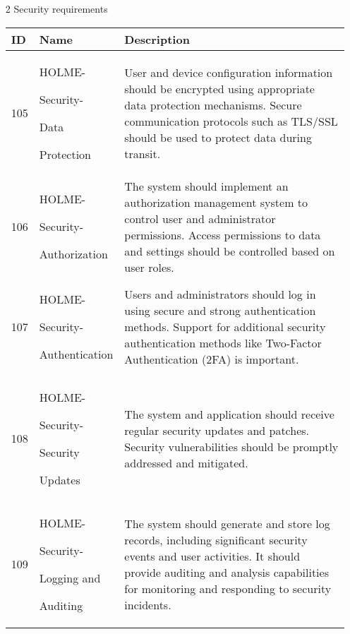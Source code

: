 \documentclass[conference]{IEEEtran}
\begin{document}
\begin{enumerate}
\vspace{3cm}
\item[2] Security requirements
\begin{table}[h]
\def\arraystretch{1.2} \small
    \begin{tabular}{|p{1cm}|p{1.8cm}|p{5.0cm}|}
        \hline
        ID & Name & Description\\ \hline
        105 \par  & HOLME-\par Security-\par Data \par Protection & User and device configuration information should be encrypted using appropriate data protection mechanisms. Secure communication protocols such as TLS/SSL should be used to protect data during transit.\\ \hline
         106 \par  & HOLME-\par Security-\par Authorization & The system should implement an authorization management system to control user and administrator permissions. Access permissions to data and settings should be controlled based on user roles.\\ \hline
         107 \par  & HOLME-\par Security-\par Authentication  & Users and administrators should log in using secure and strong authentication methods. Support for additional security authentication methods like Two-Factor Authentication (2FA) is important. \\ \hline
         108 \par  & HOLME-\par Security-\par Security \par Updates  & The system and application should receive regular security updates and patches. Security vulnerabilities should be promptly addressed and mitigated.\\ \hline
         109 \par  & HOLME-\par Security-\par Logging and \par  Auditing  &The system should generate and store log records, including significant security events and user activities. It should provide auditing and analysis capabilities for monitoring and responding to security incidents. \\ \hline
    \end{tabular}
\end{table}
\clearpage


\end{enumerate}
\end{document}
